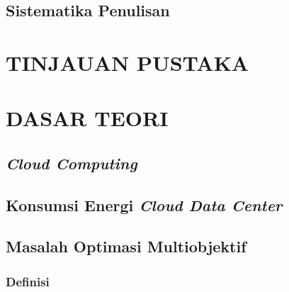 \documentclass[ugmskripsi]{ugmskripsi}
\begin{document}
	\section{Sistematika Penulisan}
	\label{pendahuluan sistematika penulisan}
	



\chapter{TINJAUAN PUSTAKA}
\label{TINJAUAN PUSTAKA}




\chapter{DASAR TEORI}
\label{DASAR TEORI}

	\section{\textit{Cloud Computing}}
	\label{cloud computing}
	

	\section{Konsumsi Energi \textit{Cloud Data Center}}
	\label{konsumsi energi}
	
	
	\section{Masalah Optimasi Multiobjektif}
	\label{multiobjektif}

		\subsection{Definisi}
		\label{definisi multiobjektif}
		
		
\end{document}
